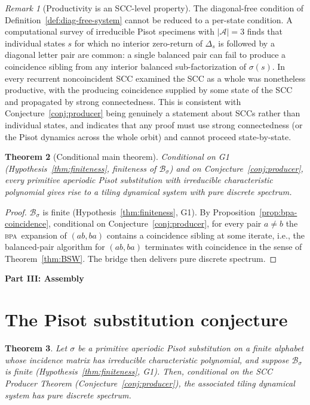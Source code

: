 \documentclass[11pt]{article}
\theoremstyle{plain}
\newtheorem{theorem}{Theorem}[section]
\theoremstyle{definition}
\theoremstyle{remark}
\newtheorem{remark}[theorem]{Remark}
\newcommand{\BPA}{\textsc{bpa}}
\newcommand{\PDS}{pure discrete spectrum}
\newcommand{\A}{\mathcal{A}}
\newcommand{\B}{\mathcal{B}}
\begin{document}
\begin{remark}[Productivity is an SCC-level property]\label{rem:scc-level}
The diagonal-free condition of Definition~\ref{def:diag-free-system} cannot be reduced to a per-state condition. A computational survey of irreducible Pisot specimens with $|\A|=3$ finds that individual states $s$ for which no interior zero-return of $\Delta_s$ is followed by a diagonal letter pair are common: a single balanced pair can fail to produce a coincidence sibling from any interior balanced sub-factorization of $\sigma(s)$. In every recurrent noncoincident SCC examined the SCC as a whole was nonetheless productive, with the producing coincidence supplied by some state of the SCC and propagated by strong connectedness. This is consistent with Conjecture~\ref{conj:producer} being genuinely a statement about SCCs rather than individual states, and indicates that any proof must use strong connectedness (or the Pisot dynamics across the whole orbit) and cannot proceed state-by-state.
\end{remark}

\begin{theorem}[Conditional main theorem]\label{thm:cond-main}
Conditional on G1 (Hypothesis~\ref{thm:finiteness}, finiteness of $\B_\sigma$) and on Conjecture~\ref{conj:producer}, every primitive aperiodic Pisot substitution with irreducible characteristic polynomial gives rise to a tiling dynamical system with \PDS.
\end{theorem}

\begin{proof}
$\B_\sigma$ is finite (Hypothesis~\ref{thm:finiteness}, G1). By Proposition~\ref{prop:bpa-coincidence}, conditional on Conjecture~\ref{conj:producer}, for every pair $a\ne b$ the \BPA\ expansion of $(ab,ba)$ contains a coincidence sibling at some iterate, i.e., the balanced-pair algorithm for $(ab,ba)$ terminates with coincidence in the sense of Theorem~\ref{thm:BSW}. The bridge then delivers \PDS.
\end{proof}

\begin{center}\textbf{Part III: Assembly}\end{center}

\section{The Pisot substitution conjecture}\label{sec:assembly}

\begin{theorem}\label{thm:main}
Let $\sigma$ be a primitive aperiodic Pisot substitution on a finite alphabet whose incidence matrix has irreducible characteristic polynomial, and suppose $\B_\sigma$ is finite \textup{(Hypothesis~\ref{thm:finiteness}, G1)}. Then, conditional on the SCC Producer Theorem (Conjecture~\ref{conj:producer}), the associated tiling dynamical system has \PDS.
\end{theorem}
\end{document}
